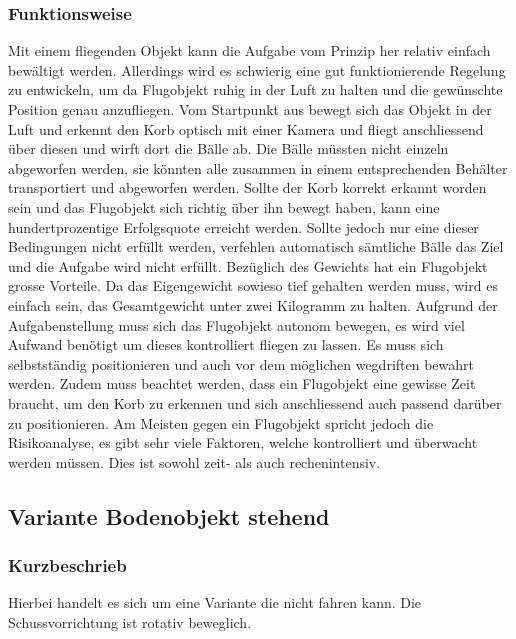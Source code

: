 \subsubsection{Funktionsweise}
Mit einem fliegenden Objekt kann die Aufgabe vom Prinzip her relativ einfach bewältigt 
werden. Allerdings wird es schwierig eine gut funktionierende Regelung zu entwickeln, um da Flugobjekt ruhig in der Luft zu halten und die gewünschte Position genau anzufliegen. 
Vom Startpunkt aus bewegt sich das Objekt in der Luft und erkennt den Korb optisch 
mit einer Kamera und fliegt anschliessend über diesen und wirft dort die Bälle 
ab. Die Bälle müssten nicht einzeln abgeworfen werden, sie könnten alle zusammen 
in einem entsprechenden Behälter transportiert und abgeworfen 
werden. Sollte der Korb korrekt erkannt worden sein und das Flugobjekt sich 
richtig über ihn bewegt haben, kann eine hundertprozentige Erfolgsquote 
erreicht werden. Sollte jedoch nur eine dieser Bedingungen nicht erfüllt werden, verfehlen  
automatisch sämtliche Bälle das Ziel und die Aufgabe wird nicht erfüllt. 
Bezüglich des Gewichts hat ein Flugobjekt grosse Vorteile. Da das Eigengewicht 
sowieso tief gehalten werden muss, wird es einfach sein, das Gesamtgewicht 
unter zwei Kilogramm zu halten.
%
Aufgrund der Aufgabenstellung muss sich das Flugobjekt autonom bewegen, es 
wird viel Aufwand benötigt um dieses kontrolliert fliegen zu lassen. Es muss 
sich selbstständig positionieren und auch vor dem möglichen wegdriften bewahrt 
werden. Zudem muss beachtet werden, dass ein Flugobjekt eine gewisse Zeit 
braucht, um den Korb zu erkennen und sich anschliessend auch passend darüber 
zu positionieren. Am Meisten gegen ein Flugobjekt spricht jedoch die 
Risikoanalyse, es gibt sehr viele Faktoren, welche kontrolliert und überwacht 
werden müssen. Dies ist sowohl zeit- als auch rechenintensiv. 



\clearpage

\subsection{Variante Bodenobjekt stehend}
\subsubsection{Kurzbeschrieb}
Hierbei handelt es sich um eine Variante die nicht fahren kann. Die Schussvorrichtung ist rotativ beweglich.

